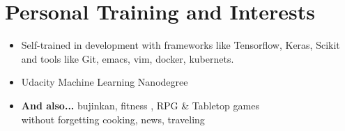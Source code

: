 \documentclass[letterpaper]{twentysecondcv} %
\begin{document}
\section{Personal Training and Interests}
\begin{itemize}
\item Self-trained in development with frameworks like Tensorflow,
  Keras, Scikit and tools like Git, emacs, vim, docker, kubernets.

\item Udacity Machine Learning Nanodegree

\item \textbf{And also...} bujinkan, fitness , RPG \& Tabletop games \\
  without forgetting cooking, news, traveling
\end{itemize}
\end{document}

